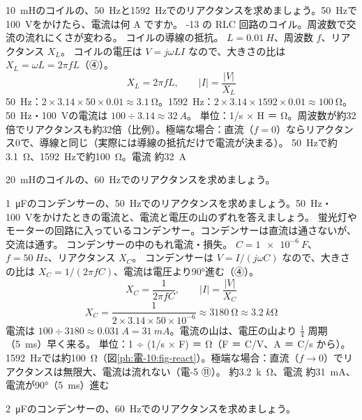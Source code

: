\begin{phreidai}[コイルのリアクタンス]
\label{ph:電-10:ex3}\qty{10}{mH}のコイルの、\qty{50}{Hz}と\qty{1592}{Hz}でのリアクタンスを求めましょう。\qty{50}{Hz}で\qty{100}{V}をかけたら、電流は何 A ですか。
-13 の RLC 回路のコイル。周波数で交流の流れにくさが変わる。
\phmushi
コイルの導線の抵抗。
\phzu
$L=\qty{0.01}{H}$、周波数 $f$、リアクタンス $X_L$。
\phriyu
コイルの電圧は $V=j\omega LI$ なので、大きさの比は $X_L=\omega L=2\pi fL$（④）。
\phtateru
\[ X_L=2\pi fL,\qquad \lvert I\rvert=\frac{\lvert V\rvert}{X_L} \]
\phtoku
\qty{50}{Hz}：$2\times3.14\times50\times0.01\approx\qty{3.1}{\ohm}$。\qty{1592}{Hz}：$2\times3.14\times1592\times0.01\approx\qty{100}{\ohm}$。\qty{50}{Hz}・\qty{100}{V}の電流は $100\div3.14\approx\qty{32}{A}$。
\phtashikame
単位：1/s × H ＝ Ω。周波数が約32倍でリアクタンスも約32倍（比例）。極端な場合：直流（$f=0$）ならリアクタンス0で、導線と同じ（実際には導線の抵抗だけで電流が決まる）。
\kotae \qty{50}{Hz}で約\qty{3.1}{\ohm}、\qty{1592}{Hz}で約\qty{100}{\ohm}。電流 約\qty{32}{A}
\end{phreidai}
\begin{jibun}
\qty{20}{mH}のコイルの、\qty{60}{Hz}でのリアクタンスを求めましょう。
\end{jibun}

\begin{phreidai}[コンデンサーのリアクタンス]
\label{ph:電-10:ex4}\qty{1}{\micro F}のコンデンサーの、\qty{50}{Hz}でのリアクタンスを求めましょう。\qty{50}{Hz}・\qty{100}{V}をかけたときの電流と、電流と電圧の山のずれを答えましょう。
\phbamen
蛍光灯やモーターの回路に入っているコンデンサー。コンデンサーは直流は通さないが、交流は通す。
\phmushi
コンデンサーの中のもれ電流・損失。
\phzu
$C=\qty{1e-6}{F}$、$f=\qty{50}{Hz}$、リアクタンス $X_C$。
\phriyu
コンデンサーは $V=I/(j\omega C)$ なので、大きさの比は $X_C=1/(2\pi fC)$、電流は電圧より90°進む（④）。
\phtateru
\[ X_C=\frac{1}{2\pi fC},\qquad \lvert I\rvert=\frac{\lvert V\rvert}{X_C} \]
\phtoku
\[ X_C=\frac{1}{2\times3.14\times50\times10^{-6}}\approx\qty{3180}{\ohm}\approx\qty{3.2}{k\ohm} \]
電流は $100\div3180\approx\qty{0.031}{A}=\qty{31}{mA}$。電流の山は、電圧の山より $\tfrac14$ 周期（\qty{5}{ms}）早く来る。
\phtashikame
単位：1 ÷ (1/s × F) ＝ Ω（F ＝ C/V、A ＝ C/s から）。\qty{1592}{Hz}では約\qty{100}{\ohm}（図\ref{ph:電-10:fig-react}）。極端な場合：直流（$f\to0$）でリアクタンスは無限大、電流は流れない（電-5 ⑪）。
\kotae 約\qty{3.2}{k\ohm}、電流 約\qty{31}{mA}、電流が90°（\qty{5}{ms}）進む
\end{phreidai}
\begin{jibun}
\qty{2}{\micro F}のコンデンサーの、\qty{60}{Hz}でのリアクタンスを求めましょう。
\end{jibun}

